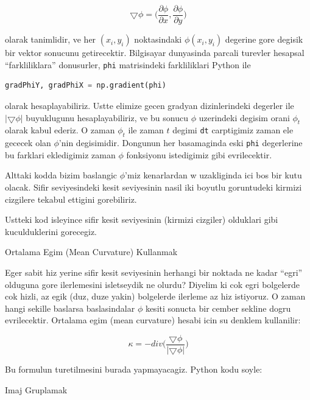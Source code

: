 \documentclass[12pt,fleqn]{article}\usepackage{../common}
\begin{document}
\[ 
\bigtriangledown \phi = \bigg(
\frac{\partial \phi}{\partial x},
\frac{\partial \phi}{\partial y} \bigg)
 \]

olarak tanimlidir, ve her $(x_i,y_i)$ noktasindaki $\phi(x_i,y_i)$
degerine gore degisik bir vektor sonucunu getirecektir. Bilgisayar
dunyasinda parcali turevler hesapsal ``farkliliklara'' donusurler,
\verb!phi! matrisindeki farkliliklari Python ile

\begin{lstlisting}[language=Python]
gradPhiY, gradPhiX = np.gradient(phi)    
\end{lstlisting}

olarak hesaplayabiliriz. Ustte elimize gecen gradyan dizinlerindeki
degerler ile $|\bigtriangledown\phi|$ buyuklugunu hesaplayabiliriz, ve bu
sonucu $\phi$ uzerindeki degisim orani $\phi_t$ olarak kabul ederiz. O
zaman $\phi_t$ ile zaman $t$ degimi \verb!dt! carptigimiz zaman ele gececek
olan $\phi$'nin degisimidir. Dongunun her basamaginda eski \verb!phi!
degerlerine bu farklari ekledigimiz zaman $\phi$ fonksiyonu istedigimiz
gibi evrilecektir.

Alttaki kodda bizim baslangic $\phi$'miz kenarlardan w uzakliginda ici bos
bir kutu olacak. Sifir seviyesindeki kesit seviyesinin nasil iki boyutlu
goruntudeki kirmizi cizgilere tekabul ettigini gorebiliriz.



Ustteki kod isleyince sifir kesit seviyesinin (kirmizi cizgiler) olduklari
gibi kuculduklerini gorecegiz.

Ortalama Egim (Mean Curvature) Kullanmak

Eger sabit hiz yerine sifir kesit seviyesinin herhangi bir noktada ne kadar
``egri'' olduguna gore ilerlemesini isletseydik ne olurdu?  Diyelim ki cok
egri bolgelerde cok hizli, az egik (duz, duze yakin) bolgelerde ilerleme az
hiz istiyoruz. O zaman hangi sekille baslarsa baslasindalar $\phi$ kesiti
sonucta bir cember sekline dogru evrilecektir. Ortalama egim (mean
curvature) hesabi icin su denklem kullanilir:

\[ \kappa = -div \bigg( \frac{\bigtriangledown \phi}
{|\bigtriangledown \phi| } \bigg) \]

Bu formulun turetilmesini burada yapmayacagiz. Python kodu soyle:



Imaj Gruplamak
\end{document}
